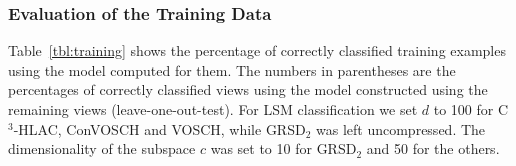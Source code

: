 \documentclass[a4paper, 10 pt, conference]{sty/ieeeconf}
\begin{document}


\subsubsection{Evaluation of the Training Data}
Table~\ref{tbl:training} shows the percentage of correctly classified training examples using the model computed for them.
The numbers in parentheses are the percentages of correctly classified views using the model constructed using the remaining views
(leave-one-out-test).
For LSM classification we set $d$ to 
100 for C$^3$-HLAC, ConVOSCH and VOSCH, while GRSD$_2$ was left uncompressed. 
The dimensionality of the subspace $c$ was set to 10 for GRSD$_2$ and 50 for the others.

\end{document}
